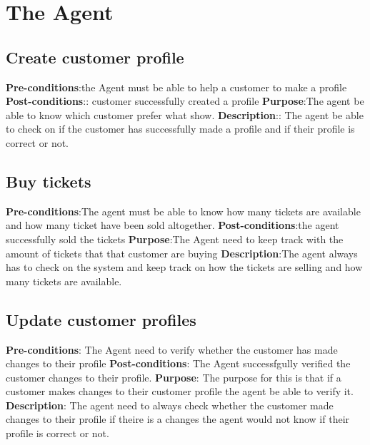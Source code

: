 \section{The Agent}

%
%

\subsection{Create customer profile}
\textbf{Pre-conditions}:the Agent must be able to help a customer to make a profile
\textbf{Post-conditions}:: customer successfully created a profile 
\textbf{Purpose}:The agent be able to know which customer prefer what show. 
\textbf{Description}:: The agent be able to check on if the customer has successfully made a profile and if their profile is correct or not.

\subsection{Buy tickets}
\textbf{Pre-conditions}:The agent must be able to know how many tickets are available and how many ticket have been sold altogether.
\textbf{Post-conditions}:the agent successfully sold the tickets
\textbf{Purpose}:The Agent need to keep track with the amount of tickets that that customer are buying
\textbf{Description}:The agent always has to check on the system and keep track on how the tickets are selling and how many tickets are available.



\subsection{Update customer profiles}
\textbf{Pre-conditions}: The Agent need to verify whether the customer has made changes to their profile 
\textbf{Post-conditions}: The Agent successfgully verified the customer changes to their profile.
\textbf{Purpose}: The purpose for this is that if a customer makes changes to their customer profile the agent be able to verify it. 
\textbf{Description}: The agent need to always check whether the customer made changes to their profile if theire is a changes the agent would not know if their profile is correct or not.

